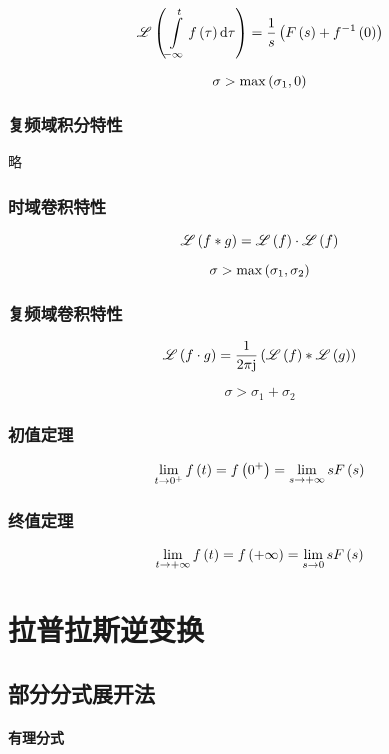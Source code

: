 \documentclass{article}
\begin{document}
\[\mathscr L\left(\int\limits_{-\infty}^tf\left(\tau\right)\mathrm d\tau\right)=
    \frac1s\left(F\left(s\right)+f^{-1}\left(0\right)\right)\]

\[\sigma>\max\left(\sigma_1,0\right)\]

\subsubsection{复频域积分特性}

略

\subsubsection{时域卷积特性}

\[\mathscr L\left(f\ast g\right)=\mathscr L\left(f\right)\cdot\mathscr L\left(f\right)\]

\[\sigma>\max\left(\sigma_1,\sigma_2\right)\]

\subsubsection{复频域卷积特性}

\[\mathscr L\left(f\cdot g\right)=
    \frac1{2\pi\mathrm j}\left(\mathscr L\left(f\right)\ast\mathscr L\left(g\right)\right)\]

\[\sigma>\sigma_1+\sigma_2\]

\subsubsection{初值定理}

\[\lim_{t\to0^+}f\left(t\right)=f\left(0^+\right)=\lim_{s\to+\infty}sF\left(s\right)\]

\subsubsection{终值定理}

\[\lim_{t\to+\infty}f\left(t\right)=f\left(+\infty\right)=\lim_{s\to0}sF\left(s\right)\]

\section{拉普拉斯逆变换}

\subsection{部分分式展开法}

\paragraph{有理分式}
\end{document}
